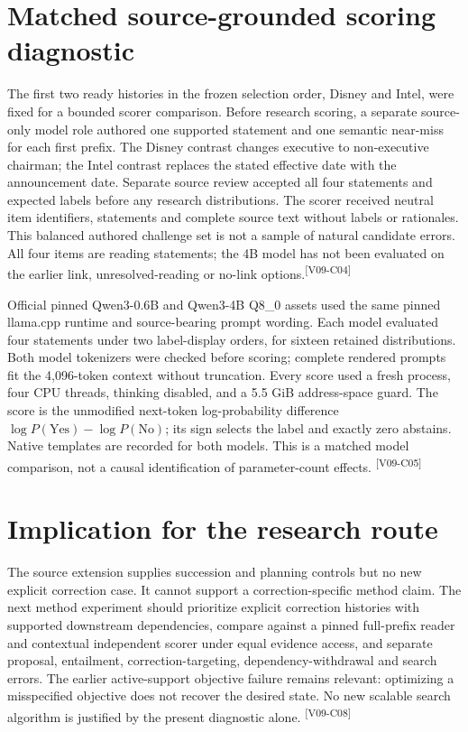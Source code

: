 \documentclass[10pt,letterpaper]{article}
\newcommand{\claim}[1]{\textsuperscript{\scriptsize[#1]}}
\begin{document}
\section{Matched source-grounded scoring diagnostic}
\label{sec:design}
The first two ready histories in the frozen selection order, Disney and Intel,
were fixed for a bounded scorer comparison. Before research scoring, a separate
source-only model role authored one supported statement and one semantic
near-miss for each first prefix. The Disney contrast changes executive to
non-executive chairman; the Intel contrast replaces the stated effective date
with the announcement date. Separate source review accepted all four statements
and expected labels before any research distributions. The scorer received
neutral item identifiers, statements and complete source text without labels
or rationales. This balanced authored challenge set is not a sample of natural
candidate errors. All four items are reading statements; the 4B model has not
been evaluated on the earlier link, unresolved-reading or no-link options.\claim{V09-C04}

Official pinned Qwen3-0.6B and Qwen3-4B Q8\_0 assets used the same pinned
llama.cpp runtime and source-bearing prompt wording. Each model evaluated four
statements under two label-display orders, for sixteen retained distributions.
Both model tokenizers were checked before scoring; complete rendered prompts
fit the 4,096-token context without truncation. Every score used a fresh process,
four CPU threads, thinking disabled, and a 5.5 GiB address-space guard. The score
is the unmodified next-token log-probability difference
$\log P(\mathrm{Yes})-\log P(\mathrm{No})$; its sign selects the label and exactly
zero abstains. Native templates are recorded for both models. This is a matched
model comparison, not a causal identification of parameter-count effects.
\claim{V09-C05}



\section{Implication for the research route}
\label{sec:implication}
The source extension supplies succession and planning controls but no new
explicit correction case. It cannot support a correction-specific method claim.
The next method experiment should prioritize explicit correction histories
with supported downstream dependencies, compare against a pinned full-prefix
reader and contextual independent scorer under equal evidence access, and
separate proposal, entailment, correction-targeting, dependency-withdrawal and
search errors. The earlier active-support objective failure remains relevant:
optimizing a misspecified objective does not recover the desired state.
No new scalable search algorithm is justified by the present diagnostic alone.
\claim{V09-C08}
\end{document}
